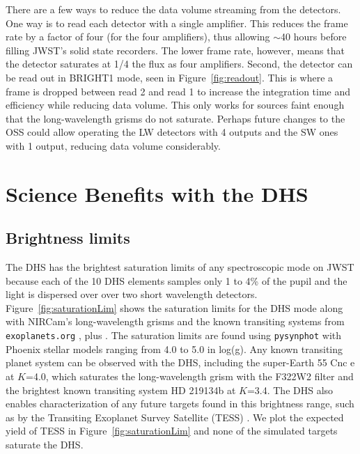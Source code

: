 \documentclass[iop]{emulateapj}
\begin{document}
There are a few ways to reduce the data volume streaming from the detectors.
One way is to read each detector with a single amplifier.
This reduces the frame rate by a factor of four (for the four amplifiers), thus allowing $\sim$40 hours before filling JWST's solid state recorders.
The lower frame rate, however, means that the detector saturates at 1/4 the flux as four amplifiers.
Second, the detector can be read out in BRIGHT1 mode, seen in Figure~\ref{fig:readout}.
This is where a frame is dropped between read 2 and read 1 to increase the integration time and efficiency while reducing data volume.
This only works for sources faint enough that the long-wavelength grisms do not saturate.
Perhaps future changes to the OSS could allow operating the LW detectors with 4 outputs and the SW ones with 1 output, reducing data volume considerably.

\section{Science Benefits with the DHS}\label{sec:addedScience}

\subsection{Brightness limits}\label{sec:brightness}


The DHS has the brightest saturation limits of any spectroscopic mode on JWST because each of the 10 DHS elements samples only 1 to 4\% of the pupil and the light is dispersed over over two short wavelength detectors.
Figure~\ref{fig:saturationLim} shows the saturation limits for the DHS mode along with NIRCam's long-wavelength grisms and the known transiting systems from \texttt{exoplanets.org} \citep{han2014exopDorg}, plus \citet{motalebi2015hd219134b}.
The saturation limits are found using \texttt{pysynphot} \citep{lim2015pysynphot} with Phoenix stellar models \citep{allard2012phoenix} ranging from 4.0 to 5.0 in log(g).
Any known transiting planet system can be observed with the DHS, including the super-Earth  55 Cnc e \citep{mcarthur2004disc55cnce} at $K$=4.0, which saturates the long-wavelength grism with the F322W2 filter and the brightest known transiting system HD 219134b \citep{motalebi2015hd219134b} at $K$=3.4.
The DHS also enables characterization of any future targets found in this brightness range, such as by the Transiting Exoplanet Survey Satellite (TESS) \citep{ricker2014tess}.
We plot the expected yield of TESS \citep{sullivan2015tess} in Figure~\ref{fig:saturationLim} and none of the simulated targets saturate the DHS.
\end{document}
